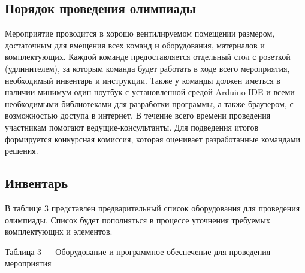 \subsection*{Порядок проведения олимпиады}

Мероприятие проводится в хорошо вентилируемом помещении размером, достаточным для вмещения всех команд и оборудования, материалов и комплектующих. Каждой команде предоставляется отдельный стол с розеткой (удлинителем), за которым команда будет работать в ходе всего мероприятия, необходимый инвентарь и инструкции. Также у команды должен иметься в наличии минимум один ноутбук с установленной средой Arduino IDE и всеми необходимыми библиотеками для разработки программы, а также браузером, с возможностью доступа в интернет. В течение всего времени проведения участникам помогают ведущие-консультанты. Для подведения итогов формируется конкурсная комиссия, которая оценивает разработанные командами решения.

\subsection*{Инвентарь}

В таблице 3 представлен предварительный список оборудования для проведения олимпиады. Список будет пополняться в процессе уточнения требуемых комплектующих и элементов.


Таблица 3 — Оборудование и программное обеспечение для проведения мероприятия

